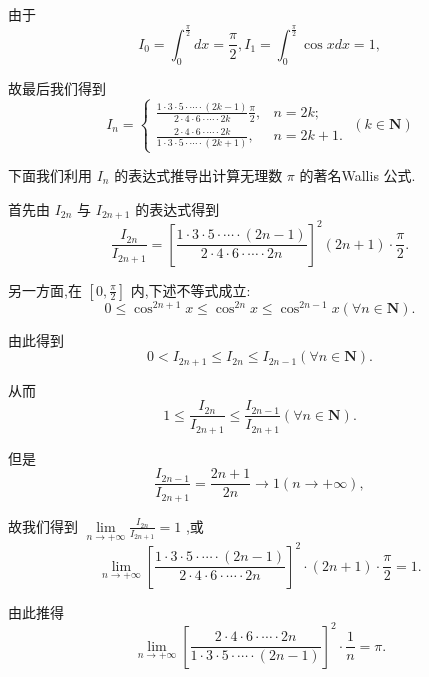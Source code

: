 由于
$${I}_{0} = {\int }_{0}^{\frac{\pi }{2}}{dx} = \frac{\pi }{2},{I}_{1} = {\int }_{0}^{\frac{\pi }{2}}\cos {xdx} = 1,$$

故最后我们得到
$${I}_{n} = \left\{  {\begin{array}{ll} \frac{1 \cdot  3 \cdot  5 \cdot  \cdots  \cdot  \left( {{2k} - 1}\right) }{2 \cdot  4 \cdot  6 \cdot  \cdots  \cdot  {2k}}\frac{\pi }{2}, & n = {2k}; \\  \frac{2 \cdot  4 \cdot  6 \cdot  \cdots  \cdot  {2k}}{1 \cdot  3 \cdot  5 \cdot  \cdots  \cdot  \left( {{2k} + 1}\right) }, & n = {2k} + 1. \end{array}\;\left( {k \in  \mathbf{N}}\right) }\right.$$

下面我们利用 ${I}_{n}$ 的表达式推导出计算无理数 $\pi$ 的著名Wallis 公式.

首先由 ${I}_{2n}$ 与 ${I}_{{2n} + 1}$ 的表达式得到
$$\frac{{I}_{2n}}{{I}_{{2n} + 1}} = {\left\lbrack  \frac{1 \cdot  3 \cdot  5 \cdot  \cdots  \cdot  \left( {{2n} - 1}\right) }{2 \cdot  4 \cdot  6 \cdot  \cdots  \cdot  {2n}}\right\rbrack  }^{2}\left( {{2n} + 1}\right)  \cdot  \frac{\pi }{2}.$$

另一方面,在 $\left\lbrack  {0,\frac{\pi }{2}}\right\rbrack$ 内,下述不等式成立:
$$0 \leq  {\cos }^{{2n} + 1}x \leq  {\cos }^{2n}x \leq  {\cos }^{{2n} - 1}x\left( {\forall n \in  \mathbf{N}}\right) .$$

由此得到
$$0 < {I}_{{2n} + 1} \leq  {I}_{2n} \leq  {I}_{{2n} - 1}\left( {\forall n \in  \mathbf{N}}\right) .$$

从而
$$1 \leq  \frac{{I}_{2n}}{{I}_{{2n} + 1}} \leq  \frac{{I}_{{2n} - 1}}{{I}_{{2n} + 1}}\left( {\forall n \in  \mathbf{N}}\right) .$$

但是
$$\frac{{I}_{{2n} - 1}}{{I}_{{2n} + 1}} = \frac{{2n} + 1}{2n} \rightarrow  1\left( {n \rightarrow   + \infty }\right) ,$$

故我们得到 $\mathop{\lim }\limits_{{n \rightarrow   + \infty }}\frac{{I}_{2n}}{{I}_{{2n} + 1}} = 1$ ,或
$$\mathop{\lim }\limits_{{n \rightarrow   + \infty }}{\left\lbrack  \frac{1 \cdot  3 \cdot  5 \cdot  \cdots  \cdot  \left( {{2n} - 1}\right) }{2 \cdot  4 \cdot  6 \cdot  \cdots  \cdot  {2n}}\right\rbrack  }^{2} \cdot  \left( {{2n} + 1}\right)  \cdot  \frac{\pi }{2} = 1.$$

由此推得
$$\mathop{\lim }\limits_{{n \rightarrow   + \infty }}{\left\lbrack  \frac{2 \cdot  4 \cdot  6 \cdot  \cdots  \cdot  {2n}}{1 \cdot  3 \cdot  5 \cdot  \cdots  \cdot  \left( {{2n} - 1}\right) }\right\rbrack  }^{2} \cdot  \frac{1}{n} = \pi .$$


